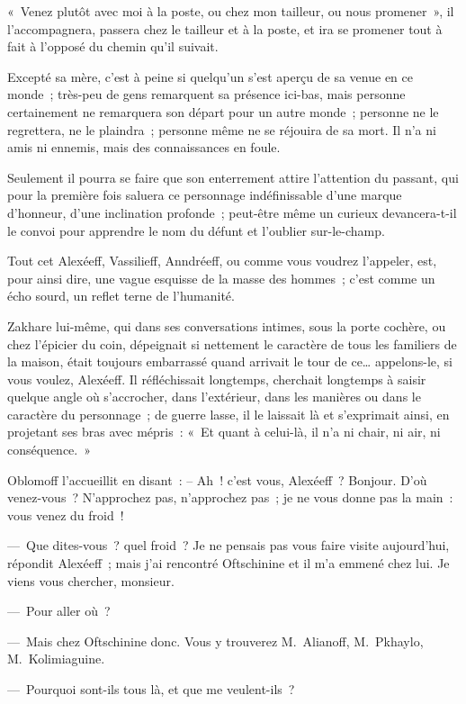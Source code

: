 \documentclass[french,twoside]{book} %
\begin{document}
« Venez plutôt avec moi à la poste, ou chez mon tailleur, ou nous promener », il l’accompagnera, passera chez le tailleur et à la poste, et ira se promener tout à fait à l’opposé du chemin qu’il suivait.\par
Excepté sa mère, c’est à peine si quelqu’un s’est aperçu de sa venue en ce monde ; très-peu de gens remarquent sa présence ici-bas, mais personne certainement ne remarquera son départ pour un autre monde ; personne ne le regrettera, ne le plaindra ; personne même ne se réjouira de sa mort. Il n’a ni amis ni ennemis, mais des connaissances en foule.\par
Seulement il pourra se faire que son enterrement attire l’attention du passant, qui pour la première fois saluera ce personnage indéfinissable d’une marque d’honneur, d’une inclination profonde ; peut-être même un curieux devancera-t-il le convoi pour apprendre le nom du défunt et l’oublier sur-le-champ.\par
Tout cet Alexéeff, Vassilieff, Anndréeff, ou comme vous voudrez l’appeler, est, pour ainsi dire, une vague esquisse de la masse des hommes ; c’est comme un écho sourd, un reflet terne de l’humanité.\par
Zakhare lui-même, qui dans ses conversations intimes, sous la porte cochère, ou chez l’épicier du coin, dépeignait si nettement le caractère de tous les familiers de la maison, était toujours embarrassé quand arrivait le tour de ce… appelons-le, si vous voulez, Alexéeff. Il réfléchissait longtemps, cherchait longtemps à saisir quelque angle où s’accrocher, dans l’extérieur, dans les manières ou dans le caractère du personnage ; de guerre lasse, il le laissait là et s’exprimait ainsi, en projetant ses bras avec mépris : « Et quant à celui-là, il n’a ni chair, ni air, ni conséquence. »\par
Oblomoff l’accueillit en disant : – Ah ! c’est vous, Alexéeff ? Bonjour. D’où venez-vous ? N’approchez pas, n’approchez pas ; je ne vous donne pas la main : vous venez du froid !\par
— Que dites-vous ? quel froid ? Je ne pensais pas vous faire visite aujourd’hui, répondit Alexéeff ; mais j’ai rencontré Oftschinine et il m’a emmené chez lui. Je viens vous chercher, monsieur.\par
— Pour aller où ?\par
— Mais chez Oftschinine donc. Vous y trouverez M. Alianoff, M. Pkhaylo, M. Kolimiaguine.\par
— Pourquoi sont-ils tous là, et que me veulent-ils ?\par
\end{document}
